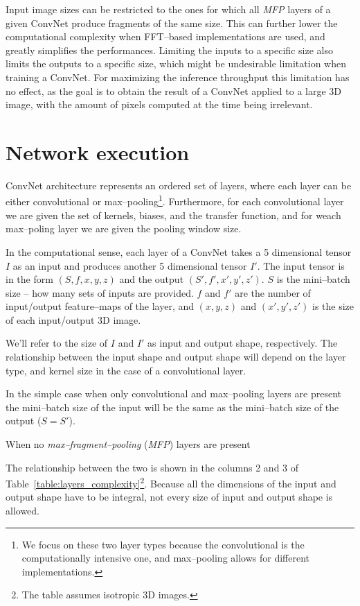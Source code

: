 \documentclass[conference]{./IEEEtran/IEEEtran}
\begin{document}
  Input image sizes can be restricted to the ones for which all
  \emph{MFP} layers of a given ConvNet produce fragments of the same
  size.  This can further lower the computational complexity when
  FFT--based implementations are used, and greatly simplifies the
  performances.  Limiting the inputs to a specific size also limits
  the outputs to a specific size, which might be undesirable
  limitation when training a ConvNet.  For maximizing the inference
  throughput this limitation has no effect, as the goal is to obtain
  the result of a ConvNet applied to a large 3D image, with the amount
  of pixels computed at the time being irrelevant.

\section{Network execution}

  ConvNet architecture represents an ordered set of layers, where each
  layer can be either convolutional or max--pooling\footnote{We focus
    on these two layer types because the convolutional is the
    computationally intensive one, and max--pooling allows for
    different implementations.}.  Furthermore, for each convolutional
  layer we are given the set of kernels, biases, and the transfer
  function, and for weach max--poling layer we are given the pooling
  window size.

  In the computational sense, each layer of a ConvNet takes a 5
  dimensional tensor $I$ as an input and produces another 5
  dimensional tensor $I'$.  The input tensor is in the form
  $(S,f,x,y,z)$ and the output $(S',f',x',y',z')$.  $S$ is the
  mini--batch size -- how many sets of inputs are provided.  $f$ and
  $f'$ are the number of input/output feature--maps of the layer, and
  $(x,y,z)$ and $(x',y',z')$ is the size of each input/output 3D
  image.

  We'll refer to the size of $I$ and $I'$ as input and output shape,
  respectively.  The relationship between the input shape and output
  shape will depend on the layer type, and kernel size in the case of
  a convolutional layer.

  In the simple case when only convolutional and max--pooling layers
  are present the mini--batch size of the input will be the same as
  the mini--batch size of the output ($S = S'$).

  When no \emph{max--fragment--pooling} (\emph{MFP}) layers are
  present

  The relationship between the two is shown in
  the columns 2 and 3 of
  Table~\ref{table:layers_complexity}\footnote{The table assumes
    isotropic 3D images.}.  Because all the dimensions of the input
  and output shape have to be integral, not every size of input and
  output shape is allowed.
\end{document}
